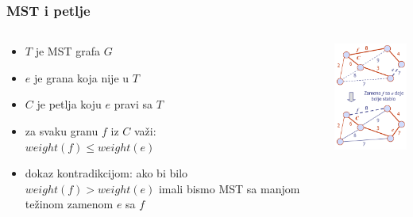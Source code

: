 \documentclass[compress,aspectratio=169]{beamer}
\begin{document}
\begin{frame}[fragile]
  \frametitle{MST i petlje}
  \begin{columns}
    \begin{column}[t]{7cm}
      \begin{itemize}
        \item $T$ je MST grafa $G$
        \item $e$ je grana koja nije u $T$
        \item $C$ je petlja koju $e$ pravi sa $T$
        \item za svaku granu $f$ iz $C$ važi: \\ $weight(f)\leq weight(e)$
        \item dokaz kontradikcijom: ako bi bilo $weight(f)>weight(e)$
          imali bismo MST sa manjom težinom zamenom $e$ sa $f$
      \end{itemize}
    \end{column}
    \begin{column}[t]{5cm}
      \begin{center}
        \includegraphics[width=4.5cm]{asp-14-pic70.png}
      \end{center}
    \end{column}
  \end{columns}
\end{frame}
\end{document}
